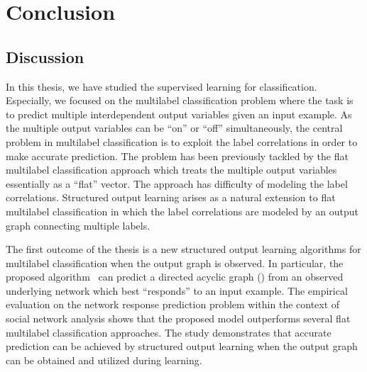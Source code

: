 {%
%
%
\chapter{Conclusion} \label{ch_conclusion}


\section{Discussion}

In this thesis, we have studied the supervised learning for classification.
Especially, we focused on the multilabel classification problem where the task is to predict multiple interdependent output variables given an input example.
As the multiple output variables can be ``on'' or ``off'' simultaneously, the central problem in multilabel classification is to exploit the label correlations in order to make accurate prediction.
The problem has been previously tackled by the flat multilabel classification approach which treats the multiple output variables essentially as a ``flat'' vector.
The approach has difficulty of modeling the label correlations.
Structured output learning arises as a natural extension to flat multilabel classification in which the label correlations are modeled by an output graph connecting multiple labels.

The first outcome of the thesis is a new structured output learning algorithms for multilabel classification when the output graph is observed.
In particular, the proposed algorithm \spin\ can predict a directed acyclic graph (\daggraph) from an observed underlying network which best ``responds'' to an input example.
The empirical evaluation on the network response prediction problem within the context of social network analysis shows that the proposed model outperforms several flat multilabel classification approaches.
The study demonstrates that accurate prediction can be achieved by structured output learning when the output graph can be obtained and utilized during learning.

}
